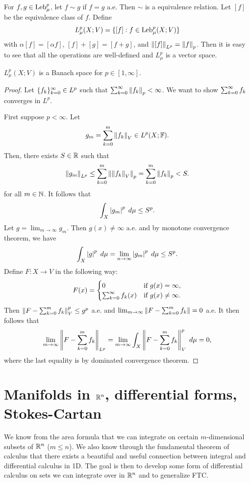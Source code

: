 \documentclass[a4paper]{article}
\begin{document}
\begin{defi}[$L^p$ spaces]
For $f, g \in \operatorname{Leb}_\mu^p$, let $f \sim g$ if
$f = g$ a.e. Then $\sim$ is a equivalence relation.
Let $[f]$ be the equivalence class of $f$. Define
\[
L^p_\mu (X; V) = \{[f] : f \in \operatorname{Leb}_\mu^p (X; V)\}
\]
with $\alpha [f] = [\alpha f]$, $[f] + [g] = [f + g]$,
and $\left\lVert [f]\right\rVert_{L^p} = \left\lVert f\right\rVert_p$. Then it is easy to see
that all the operations are well-defined and $L^p_\mu$ is
a vector space.
\end{defi}

\begin{thm}
$L^p_\mu(X; V)$ is a Banach space for $p \in [1, \infty]$.
\end{thm}

\begin{proof}
Let $\{ f_k \}_{k=0}^\infty \in L^p$ such that $\sum_{k=0}^\infty \left\lVert f_k\right\rVert_p
< \infty$. We want to show $\sum_{k=0}^\infty f_k$ converges in $L^p$.

First suppose $p < \infty$. Let
\[
g_m = \sum_{k=0}^m \left\lVert f_k\right\rVert_V \in L^p(X; \mathbb{F}).
\]
Then, there exists $S \in \mathbb{R}$ such that
\[
\left\lVert g_m\right\rVert_{L^p} \leq \sum_{k=0}^m \left\lVert \left\lVert f_k\right\rVert_V\right\rVert_p
= \sum_{k=0}^m \left\lVert f_k\right\rVert_p < S.
\]
for all $m \in \mathbb{N}$. It follows that
\[
\int_X \left\lvert g_m\right\rvert^p \; d \mu \leq S^p.
\]
Let $g = \lim_{m \to \infty} g_m$. Then
$g(x) \neq \infty$ a.e. and by monotone convergence theorem,
we have
\[
\int_X \left\lvert g\right\rvert^p \; d \mu = \lim_{n \to \infty}
\left\lvert g_m\right\rvert^p \; d \mu \leq S^p.
\]
Define $F: X \to V$ in the following way:
\[
F(x) = \begin{cases}
  0 & \text{if $g(x) = \infty$}, \\
  \sum_{k=0}^\infty f_k(x) & \text{if $g(x) \neq \infty$}.
\end{cases}
\]
Then $\left\lVert F - \sum_{k=0}^m f_k\right\rVert_V^p \leq g^p$ a.e.
and $\lim_{m \to \infty} \left\lVert F - \sum_{k=0}^m f_k\right\rVert = 0$ a.e.
It then follows that
\[
\lim_{m \to \infty} \left\lVert F - \sum_{k=0}^m f_k\right\rVert_{L^p}
= \lim_{m \to \infty} \int_X \left\lVert F - \sum_{k=0}^m f_k\right\rVert^p_V \; d \mu
= 0,
\]
where the last equality is by dominated convergence
theorem.
\end{proof}





\section{Manifolds in $\mathbb{R}^n$, differential forms,
Stokes-Cartan}

We know from the area formula that we can integrate on
certain $m$-dimensional subsets of $\mathbb{R}^n$ ($m \leq n$).
We also know through the fundamental theorem of calculus that
there exists a beautiful and useful connection between
integral and differential calculus in 1D. The goal is then
to develop some form of differential calculus on sets we can
integrate over in $\mathbb{R}^n$ and to generalize FTC.
\end{document}
